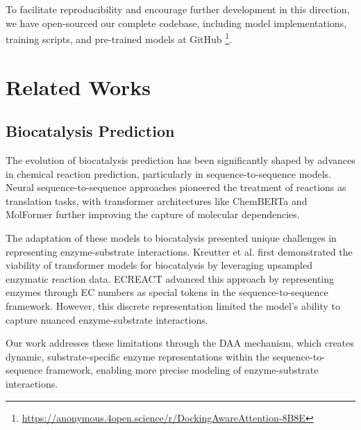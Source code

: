 \documentclass[sigconf]{acmart}
\begin{document}
To facilitate reproducibility and encourage further development in this direction, we have open-sourced our complete codebase, including model implementations, training scripts, and pre-trained models at GitHub \footnote{\url{https://anonymous.4open.science/r/DockingAwareAttention-8B8E}}.


\section{Related Works}

\subsection{Biocatalysis Prediction}
The evolution of biocatalysis prediction has been significantly shaped by advances in chemical reaction prediction, particularly in sequence-to-sequence models. Neural sequence-to-sequence approaches \cite{schwaller2019molecular} pioneered the treatment of reactions as translation tasks, with transformer architectures like ChemBERTa \cite{ChithranandaChemBERTa} and MolFormer \cite{ross2022large} further improving the capture of molecular dependencies.

The adaptation of these models to biocatalysis presented unique challenges in representing enzyme-substrate interactions. Kreutter et al. \cite{kreutter2021predicting} first demonstrated the viability of transformer models for biocatalysis by leveraging upsampled enzymatic reaction data. ECREACT \cite{Probst2022} advanced this approach by representing enzymes through EC numbers as special tokens in the sequence-to-sequence framework. However, this discrete representation limited the model's ability to capture nuanced enzyme-substrate interactions.

Our work addresses these limitations through the DAA mechanism, which creates dynamic, substrate-specific enzyme representations within the sequence-to-sequence framework, enabling more precise modeling of enzyme-substrate interactions.
\end{document}
